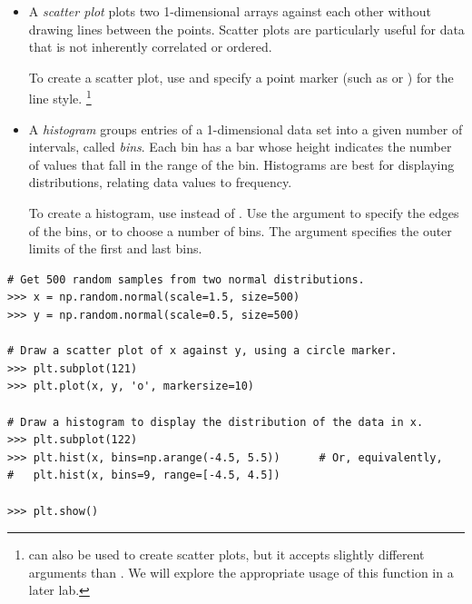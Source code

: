 \begin{itemize}
\item A \emph{scatter plot} plots two 1-dimensional arrays against each other without drawing lines between the points.
Scatter plots are particularly useful for data that is not inherently correlated or ordered.

To create a scatter plot, use  and specify a point marker (such as  or ) for the line style.%
\footnote{ can also be used to create scatter plots, but it accepts slightly different arguments than . We will explore the appropriate usage of this function in a later lab.}

\item A \emph{histogram} groups entries of a 1-dimensional data set into a given number of intervals, called \emph{bins}.
Each bin has a bar whose height indicates the number of values that fall in the range of the bin.
Histograms are best for displaying distributions, relating data values to frequency.

To create a histogram, use  instead of .
Use the argument  to specify the edges of the bins, or to choose a number of bins.
The  argument specifies the outer limits of the first and last bins.
\end{itemize}

\begin{lstlisting}
# Get 500 random samples from two normal distributions.
>>> x = np.random.normal(scale=1.5, size=500)
>>> y = np.random.normal(scale=0.5, size=500)

# Draw a scatter plot of x against y, using a circle marker.
>>> plt.subplot(121)
>>> plt.plot(x, y, 'o', markersize=10)

# Draw a histogram to display the distribution of the data in x.
>>> plt.subplot(122)
>>> plt.hist(x, bins=np.arange(-4.5, 5.5))      # Or, equivalently,
#   plt.hist(x, bins=9, range=[-4.5, 4.5])

>>> plt.show()
\end{lstlisting}

